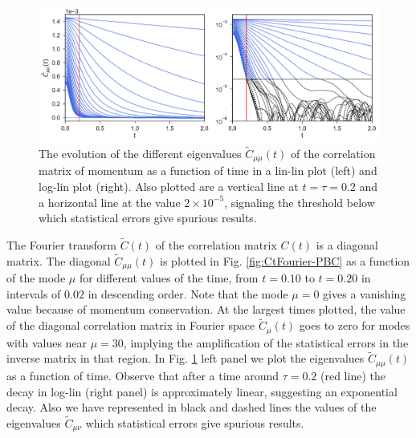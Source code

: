 \documentclass[b5paper,openright,11pt]{book}
\begin{document}
\begin{figure}[h!]
  \centering
  \includegraphics[width=\linewidth]{CtFourier-PBC-exp}
  \caption[Evolution of different eigenvalues $\tilde{C}_{\mu\nu}(t)$ for PBC]{
  The  evolution of  the different
  eigenvalues  $\tilde{C}_{\mu\mu}(t)$ of  the  correlation matrix  of
  momentum  as  a  function  of   time  in  a  lin-lin  plot  (left)
  and   log-lin   plot
  (right). Also  plotted are  a vertical line  at $t=\tau=0.2$  and a
  horizontal  line  at  the   value  $2\times10^{-5}$,  signaling  the
  threshold below which statistical errors give spurious results. }
\label{fig:CtFourier-PBC-exp}
\end{figure}

The Fourier transform $\tilde{C}(t)$  of the correlation matrix $C(t)$
is a diagonal matrix.  The diagonal $\tilde{C}_{\mu\mu}(t)$ is plotted
in Fig.   \ref{fig:CtFourier-PBC} as a function of the mode
$\mu$      for      different       values      of      the      time,
from $t=0.10$ to $t=0.20$ in intervals of $0.02$ in  descending   order.   Note that the  mode
$\mu=0$ gives a vanishing value  because of momentum conservation. At the largest times plotted,
the  value  of  the  diagonal  correlation  matrix  in  Fourier  space
$\tilde{C}_\mu(t)$ goes to  zero for modes with  values near $\mu=30$,
implying the  amplification of the  statistical errors in  the inverse
matrix in that  region.  In Fig.  \ref{fig:CtFourier-PBC-exp}  left panel we
plot the  eigenvalues $\tilde{C}_{\mu\mu}(t)$  as a function  of time.
Observe  that after  a time  around  $\tau=0.2$ (red line) the  decay in  log-lin
(right  panel) is  approximately  linear,  suggesting an  exponential
decay. Also we have represented in black and dashed lines the values of the eigenvalues $\tilde{C}_{\mu\nu}$ which statistical errors give spurious results. 
\end{document}
